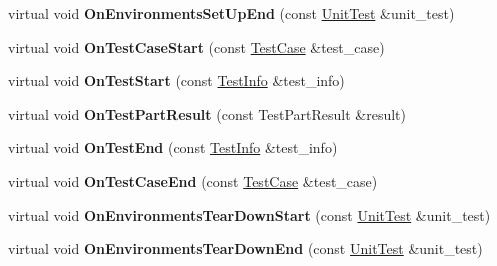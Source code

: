 \begin{DoxyCompactItemize}
virtual void {\bfseries On\+Environments\+Set\+Up\+End} (const \hyperlink{classtesting_1_1UnitTest}{Unit\+Test} \&unit\+\_\+test)
\item 
\mbox{\label{classtesting_1_1internal_1_1TestEventRepeater_a70124c738caa338bcd723eb2a51c8b3e}} 
virtual void {\bfseries On\+Test\+Case\+Start} (const \hyperlink{classtesting_1_1TestCase}{Test\+Case} \&test\+\_\+case)
\item 
\mbox{\label{classtesting_1_1internal_1_1TestEventRepeater_a70d694ca5010cc86cd458f7f529e6fbe}} 
virtual void {\bfseries On\+Test\+Start} (const \hyperlink{classtesting_1_1TestInfo}{Test\+Info} \&test\+\_\+info)
\item 
\mbox{\label{classtesting_1_1internal_1_1TestEventRepeater_ac8fb21da6802b1ebab9cad3eee9150eb}} 
virtual void {\bfseries On\+Test\+Part\+Result} (const Test\+Part\+Result \&result)
\item 
\mbox{\label{classtesting_1_1internal_1_1TestEventRepeater_aa0f13bded9369aae1c78583d7276f8b1}} 
virtual void {\bfseries On\+Test\+End} (const \hyperlink{classtesting_1_1TestInfo}{Test\+Info} \&test\+\_\+info)
\item 
\mbox{\label{classtesting_1_1internal_1_1TestEventRepeater_a0a335e1c3957a8c699ed56e37ea7b978}} 
virtual void {\bfseries On\+Test\+Case\+End} (const \hyperlink{classtesting_1_1TestCase}{Test\+Case} \&test\+\_\+case)
\item 
\mbox{\label{classtesting_1_1internal_1_1TestEventRepeater_a30db75df2d9a65d787f31e16004613c2}} 
virtual void {\bfseries On\+Environments\+Tear\+Down\+Start} (const \hyperlink{classtesting_1_1UnitTest}{Unit\+Test} \&unit\+\_\+test)
\item 
\mbox{\label{classtesting_1_1internal_1_1TestEventRepeater_a8428220c4cf9f0cea2dfd9a70f07ab7f}} 
virtual void {\bfseries On\+Environments\+Tear\+Down\+End} (const \hyperlink{classtesting_1_1UnitTest}{Unit\+Test} \&unit\+\_\+test)

\end{DoxyCompactItemize}
